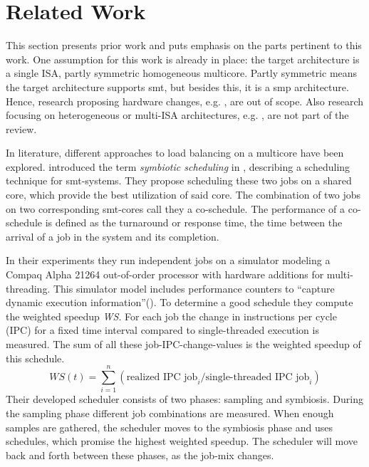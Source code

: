 \section{Related Work}
\label{state:related}

This section presents prior work and puts emphasis on the parts pertinent to
this work.
One assumption for this work is already in place:
the target architecture is a single ISA, partly symmetric homogeneous
multicore.
Partly symmetric means the target architecture supports \gls{smt},
but besides this, it is a \gls{smp} architecture.
Hence, research proposing hardware changes, e.g. \cite{cruz_dynamic_2014},
are out of scope.
Also research focusing on heterogeneous or multi-ISA architectures, e.g.
\cite{sarma_smartbalance_2015}, are not part of the review.


\begin{comment}
  Structure for the description of related work:
    * Assumptions
    * Concept
    * Relevant contribution
    * Result
    * Deficits

  Alternative: aspects of the thesis in related work;
\end{comment}

In literature, different approaches to load balancing on a multicore have been
explored.
\citeauthor{snavely_symbiotic_2000} introduced the term \emph{symbiotic
scheduling} in \cite{snavely_symbiotic_2000}, describing a scheduling technique
for \gls{smt}-systems.
They propose scheduling these two jobs on a shared core, which provide the best
utilization of said core.
The combination of two jobs on two corresponding \gls{smt}-cores call they a
co-schedule.
The performance of a co-schedule is defined as the turnaround or response time,
the time between the arrival of a job in the system and its completion.

In their experiments they run independent jobs on a simulator modeling a Compaq
Alpha 21264 out-of-order processor with hardware additions for multi-threading.
This simulator model includes performance counters to ``capture dynamic execution
information''(\autocite[236]{snavely_symbiotic_2000}).
To determine a good schedule they compute the weighted speedup \textit{WS}.
For each job the change in instructions per cycle (IPC) for a fixed time
interval compared to single-threaded execution is measured.
The sum of all these job-IPC-change-values is the weighted speedup of this
schedule.
$$ WS(t) = \sum_{i=1}^n (\text{realized IPC job}_i / \text{single-threaded IPC
job}_i)$$
Their developed scheduler consists of two phases: sampling and symbiosis.
During the sampling phase different job combinations are measured.
When enough samples are gathered, the scheduler moves to the symbiosis phase
and uses schedules, which promise the highest weighted speedup.
The scheduler will move back and forth between these phases, as the job-mix
changes.

